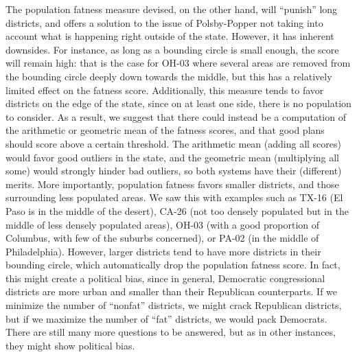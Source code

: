 \documentclass[letterpaper]{article}
\begin{document}
The population fatness measure devised, on the other hand, will “punish” long districts, and offers a solution to the issue of Polsby-Popper not taking into account what is happening right outside of the state. However, it has inherent downsides. For instance, as long as a bounding circle is small enough, the score will remain high: that is the case for OH-03 where several areas are removed from the bounding circle deeply down towards the middle, but this has a relatively limited effect on the fatness score. Additionally, this measure tends to favor districts on the edge of the state, since on at least one side, there is no population to consider. As a result, we suggest that there could instead be a computation of the arithmetic or geometric mean of the fatness scores, and that good plans should score above a certain threshold. The arithmetic mean (adding all scores) would favor good outliers in the state, and the geometric mean (multiplying all some) would strongly hinder bad outliers, so both systems have their (different) merits. More importantly, population fatness favors smaller districts, and those surrounding less populated areas. We saw this with examples such as TX-16 (El Paso is in the middle of the desert), CA-26 (not too densely populated but in the middle of less densely populated areas), OH-03 (with a good proportion of Columbus, with few of the suburbs concerned), or PA-02 (in the middle of Philadelphia). However, larger districts tend to have more districts in their bounding circle, which automatically drop the population fatness score. In fact, this might create a political bias, since in general, Democratic congressional districts are more urban and smaller than their Republican counterparts. If we minimize the number of “nonfat” districts, we might crack Republican districts, but if we maximize the number of “fat” districts, we would pack Democrats. There are still many more questions to be answered, but as in other instances, they might show political bias. 



\end{document}
